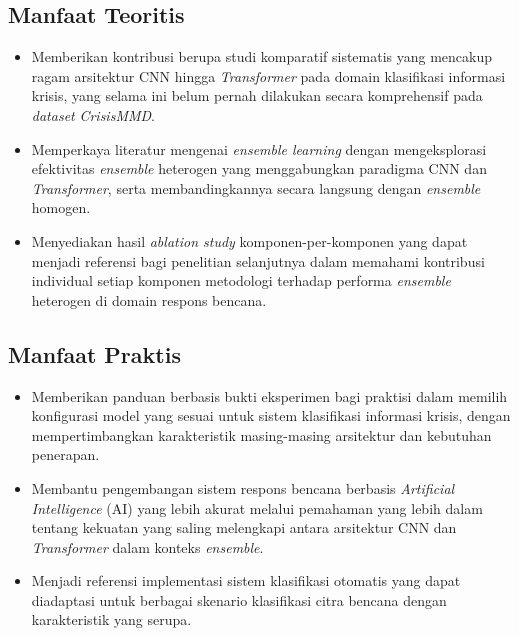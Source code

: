 \subsection{Manfaat Teoritis}
\begin{itemize}[noitemsep]
    \item Memberikan kontribusi berupa studi komparatif sistematis yang
    mencakup ragam arsitektur CNN hingga \textit{Transformer} pada
    domain klasifikasi informasi krisis, yang selama ini belum pernah
    dilakukan secara komprehensif pada \textit{dataset}
    \textit{CrisisMMD}.

    \item Memperkaya literatur mengenai \textit{ensemble learning}
    dengan mengeksplorasi efektivitas \textit{ensemble} heterogen yang
    menggabungkan paradigma CNN dan \textit{Transformer}, serta
    membandingkannya secara langsung dengan \textit{ensemble} homogen.

    \item Menyediakan hasil \textit{ablation study} komponen-per-komponen
    yang dapat menjadi referensi bagi penelitian selanjutnya dalam
    memahami kontribusi individual setiap komponen metodologi terhadap
    performa \textit{ensemble} heterogen di domain respons bencana.
\end{itemize}

\subsection{Manfaat Praktis}
\begin{itemize}[noitemsep]
    \item Memberikan panduan berbasis bukti eksperimen bagi praktisi
    dalam memilih konfigurasi model yang sesuai untuk sistem
    klasifikasi informasi krisis, dengan mempertimbangkan karakteristik
    masing-masing arsitektur dan kebutuhan penerapan.

    \item Membantu pengembangan sistem respons bencana berbasis
    \textit{Artificial Intelligence} (AI) yang lebih akurat melalui
    pemahaman yang lebih dalam tentang kekuatan yang saling melengkapi
    antara arsitektur CNN dan \textit{Transformer} dalam konteks
    \textit{ensemble}.

    \item Menjadi referensi implementasi sistem klasifikasi otomatis
    yang dapat diadaptasi untuk berbagai skenario klasifikasi citra
    bencana dengan karakteristik yang serupa.
\end{itemize}


